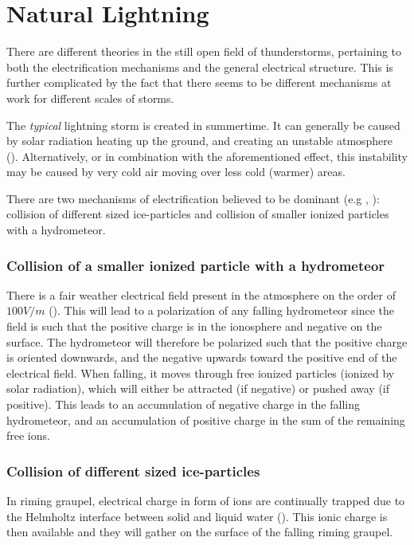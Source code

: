 \section{Natural Lightning}
There are different theories in the still open field of thunderstorms, pertaining to both the electrification mechanisms and the general electrical structure. This is further complicated by the fact that there seems to be different mechanisms at work for different scales of storms.

The \textit{typical} lightning storm is created in summertime. It can generally be caused by solar radiation heating up the ground, and creating an unstable atmosphere (\cite{rakovBok}). Alternatively, or in combination with the aforementioned effect, this instability may be caused by very cold air moving over less cold (warmer) areas.

There are two mechanisms of electrification believed to be dominant (e.g \cite{saunders2008}, \cite{soula2012}): collision of different sized ice-particles and collision of smaller ionized particles with a hydrometeor.

\subsubsection{Collision of a smaller ionized particle with a hydrometeor}
There is a fair weather electrical field present in the atmosphere on the order of $100 V/m$ (\cite{harrison2012}). This will lead to a polarization of any falling hydrometeor since the field is such that the positive charge is in the ionosphere and negative on the surface. The hydrometeor will therefore be polarized such that the positive charge is oriented downwards, and the negative upwards toward the positive end of the electrical field. When falling, it moves through free ionized particles (ionized by solar radiation), which will either be attracted (if negative) or pushed away (if positive). This leads to an accumulation of negative charge in the falling hydrometeor, and an accumulation of positive charge in the sum of the remaining free ions.

\subsubsection{Collision of different sized ice-particles}
In riming graupel, electrical charge in form of ions are continually trapped due to the Helmholtz interface between solid and liquid water (\cite{rydock1991}). This ionic charge is then available and they will gather on the surface of the falling riming graupel. 


